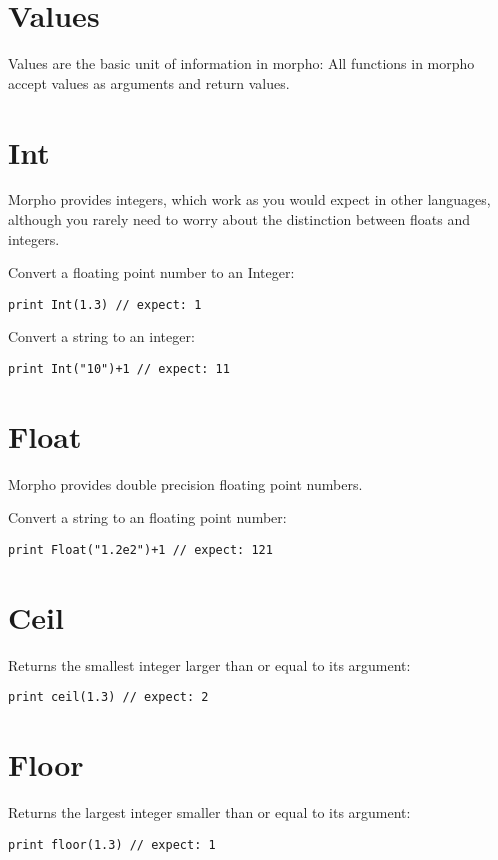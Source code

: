 \hypertarget{values}{%
\section{Values}\label{values}}

Values are the basic unit of information in morpho: All functions in
morpho accept values as arguments and return values.

\hypertarget{int}{%
\section{Int}\label{int}}

Morpho provides integers, which work as you would expect in other
languages, although you rarely need to worry about the distinction
between floats and integers.

Convert a floating point number to an Integer:

\begin{lstlisting}
print Int(1.3) // expect: 1
\end{lstlisting}

Convert a string to an integer:

\begin{lstlisting}
print Int("10")+1 // expect: 11
\end{lstlisting}

\hypertarget{float}{%
\section{Float}\label{float}}

Morpho provides double precision floating point numbers.

Convert a string to an floating point number:

\begin{lstlisting}
print Float("1.2e2")+1 // expect: 121
\end{lstlisting}

\hypertarget{ceil}{%
\section{Ceil}\label{ceil}}

Returns the smallest integer larger than or equal to its argument:

\begin{lstlisting}
print ceil(1.3) // expect: 2
\end{lstlisting}

\hypertarget{floor}{%
\section{Floor}\label{floor}}

Returns the largest integer smaller than or equal to its argument:

\begin{lstlisting}
print floor(1.3) // expect: 1
\end{lstlisting}

